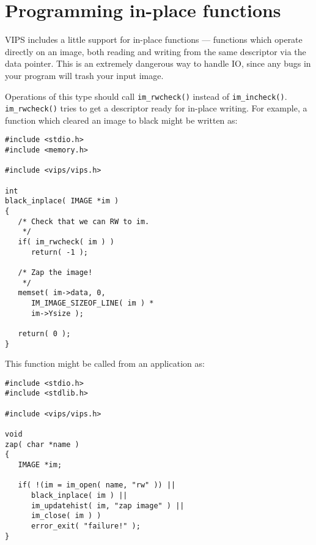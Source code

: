 \section{Programming in-place functions}

VIPS includes a little support for in-place functions --- functions
which operate directly on an image, both reading and writing from the same
descriptor via the data pointer. This is an extremely dangerous way to
handle IO, since any bugs in your program will trash your input image.

Operations of this type should call \verb+im_rwcheck()+ instead of
\verb+im_incheck()+. \verb+im_rwcheck()+ tries to get a descriptor ready
for in-place writing. For example, a function which cleared an image to
black might be written as:

\begin{verbatim}
#include <stdio.h>
#include <memory.h>

#include <vips/vips.h>

int
black_inplace( IMAGE *im )
{  
   /* Check that we can RW to im.
    */
   if( im_rwcheck( im ) )
      return( -1 );

   /* Zap the image!
    */
   memset( im->data, 0, 
      IM_IMAGE_SIZEOF_LINE( im ) * 
      im->Ysize );

   return( 0 );
}
\end{verbatim}

This function might be called from an application as:

\begin{verbatim}
#include <stdio.h>
#include <stdlib.h>

#include <vips/vips.h>

void
zap( char *name )
{
   IMAGE *im;

   if( !(im = im_open( name, "rw" )) ||
      black_inplace( im ) ||
      im_updatehist( im, "zap image" ) ||
      im_close( im ) )
      error_exit( "failure!" );
}
\end{verbatim}
